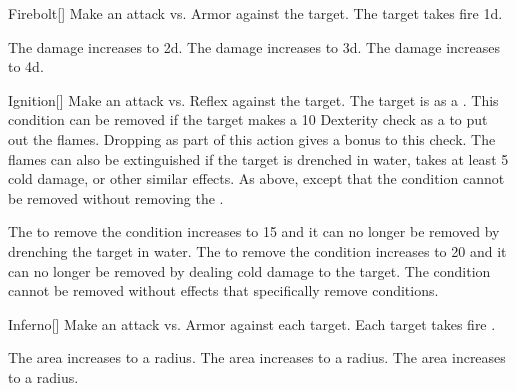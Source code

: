 \lowercase{\hypertarget{spell:Firebolt}{}}\label{spell:Firebolt}
\begin{freeability}[Rank 1]{\hypertarget{spell:Firebolt}{Firebolt}}[]
Make an attack vs. Armor against the target.
\hit The target takes fire  \plus1d.

\rankline
{} The damage increases to  \plus2d.
 The damage increases to  \plus3d.
 The damage increases to  \plus4d.
\end{freeability}
\vspace{0.25em}



\lowercase{\hypertarget{spell:Ignition}{}}\label{spell:Ignition}
\begin{freeability}[Rank 1]{\hypertarget{spell:Ignition}{Ignition}}[]
Make an attack vs. Reflex against the target.
\hit The target is  as a .
This condition can be removed if the target makes a  10 Dexterity check as a  to put out the flames.
Dropping  as part of this action gives a  bonus to this check.
The flames can also be extinguished if the target is drenched in water, takes at least 5 cold damage, or other similar effects.
\crit As above, except that the condition cannot be removed without removing the .

\rankline
{} The  to remove the condition increases to 15 and it can no longer be removed by drenching the target in water.
 The  to remove the condition increases to 20 and it can no longer be removed by dealing cold damage to the target.
 The condition cannot be removed without effects that specifically remove conditions.
\end{freeability}
\vspace{0.25em}



\lowercase{\hypertarget{spell:Inferno}{}}\label{spell:Inferno}
\begin{freeability}[Rank 1]{\hypertarget{spell:Inferno}{Inferno}}[]
Make an attack vs. Armor against each target.
\hit Each target takes fire .

\rankline
{} The area increases to a \arealarge radius.
 The area increases to a \areahuge radius.
 The area increases to a \areaext radius.
\end{freeability}
\vspace{0.25em}



